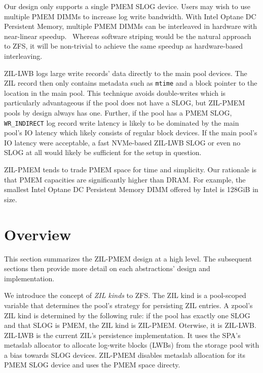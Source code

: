 \documentclass[12pt,a4paper,twoside,draft]{book}
\begin{document}
Our design only supports a single PMEM SLOG device.
Users may wish to use multiple PMEM DIMMs to increase log write bandwidth.
With Intel Optane DC Persistent Memory, multiple PMEM DIMMs can be interleaved in hardware with near-linear speedup.~\cite{yang_empirical_2020}
Whereas software striping would be the natural approach to ZFS, it will be non-trivial to achieve the same speedup as hardware-based interleaving.

ZIL-LWB logs large write records' data directly to the main pool devices.
The ZIL record then only contains metadata such as \lstinline{mtime} and a block pointer to the location in the main pool.
This technique avoids double-writes which is particularly advantageous if the pool does not have a SLOG, but ZIL-PMEM pools by design always has one.
Further, if the pool has a PMEM SLOG, \lstinline{WR_INDIRECT} log record write latency is likely to be dominated by the main pool's IO latency which likely consists of regular block devices.
If the main pool's IO latency were acceptable, a fast NVMe-based ZIL-LWB SLOG or even no SLOG at all would likely be sufficient for the setup in question.

ZIL-PMEM tends to trade PMEM space for time and simplicity.
Our rationale is that PMEM capacities are significantly higher than DRAM.
For example, the smallest Intel Optane DC Persistent Memory DIMM offered by Intel is 128GiB in size.~\cite{optanepricing_missing}

\section{Overview}
This section summarizes the ZIL-PMEM design at a high level.
The subsequent sections then provide more detail on each abstractions' design and implementation.

We introduce the concept of \textit{ZIL kinds} to ZFS.
The ZIL kind is a pool-scoped variable that determines the pool's strategy for persisting ZIL entries.
A zpool's ZIL kind is determined by the following rule:
if the pool has exactly one SLOG and that SLOG is PMEM, the ZIL kind is ZIL-PMEM. Oterwise, it is ZIL-LWB.
ZIL-LWB is the current ZIL's persistence implementation.
It uses the SPA's metaslab allocator to allocate log-write blocks (LWBs) from the storage pool with a bias towards SLOG devices.
ZIL-PMEM disables metaslab allocation for its PMEM SLOG device and uses the PMEM space directy.
\end{document}
